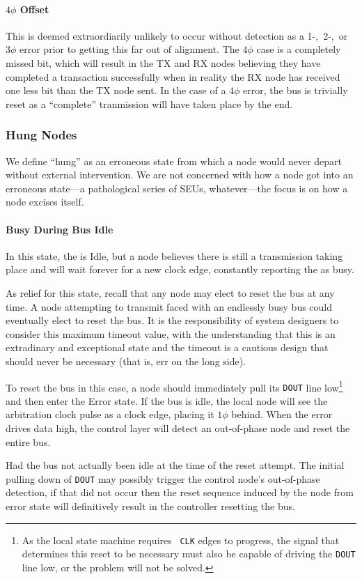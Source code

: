 \paragraph{$4\phi$ Offset}
This is deemed extraordiarily unlikely to occur without detection as a
1-,~2-,~or~$3\phi$ error prior to getting this far out of alignment.
The $4\phi$ case is a
completely missed bit, which will result in the TX and RX nodes believing they
have completed a transaction successfully when in reality the RX node has
received one less bit than the TX node sent. In the case of a $4\phi$ error,
the bus is trivially reset as a ``complete'' tranmission will have taken place
by the end.

\subsubsection{Hung Nodes}
\label{sec:reset-hung}
We define ``hung'' as an erroneous state from which a node would never depart
without external intervention. We are not concerned with how a node got into
an erroneous state---a pathological series of SEUs, whatever---the focus is on
how a node excises itself.

\paragraph{Busy During Bus Idle}
In this state, the \bus is Idle, but a node believes there is still a
transmission taking place and will wait forever for a new clock edge,
constantly reporting the \bus as busy.

As relief for this state, recall that any node may elect to reset the bus at
any time. A node attempting to transmit faced with an endlessly busy bus could
eventually elect to reset the bus. It is the responsibility of system
designers to consider this maximum timeout value, with the understanding that
this is an extradinary and exceptional state and the timeout is a cautious
design that should never be necessary (that is, err on the long side).

To reset the bus in this case, a node should immediately pull its {\tt DOUT}
line low\footnote{
  As the local state machine requires \bus~{\tt CLK} edges to progress, the
  signal that determines this reset to be necessary must also be capable of
  driving the {\tt DOUT} line low, or the problem will not be solved.
} and then enter the {\sc Error} state. If the bus is idle, the local node
will see the arbitration clock pulse as a clock edge, placing it $1\phi$
behind. When the {\sc error} drives data high, the control layer will detect
an out-of-phase node and reset the entire bus.

Had the bus not actually been idle at the time of the reset attempt. The
initial pulling down of {\tt DOUT} may possibly trigger the control node's
out-of-phase detection, if that did not occur then the reset sequence induced
by the node from {\sc error} state will definitively result in the controller
resetting the bus.
